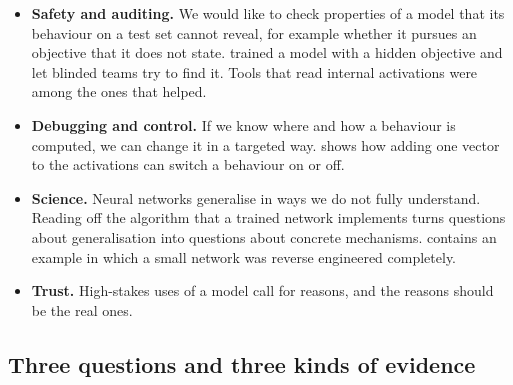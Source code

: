 \begin{itemize}
\item \textbf{Safety and auditing.} We would like to check properties of a model that its behaviour on a test set
cannot reveal, for example whether it pursues an objective that it does not state. \citet{marks2025auditing}
trained a model with a hidden objective and let blinded teams try to find it. Tools that read internal
activations were among the ones that helped.
\item \textbf{Debugging and control.} If we know where and how a behaviour is computed, we can change it in a
targeted way.  shows how adding one vector to the activations can switch a behaviour on
or off.
\item \textbf{Science.} Neural networks generalise in ways we do not fully understand. Reading off the algorithm
that a trained network implements turns questions about generalisation into questions about concrete mechanisms.
 contains an example in which a small network was reverse engineered completely.
\item \textbf{Trust.} High-stakes uses of a model call for reasons, and the reasons should be the real ones.
\end{itemize}

\subsection{Three questions and three kinds of evidence}

